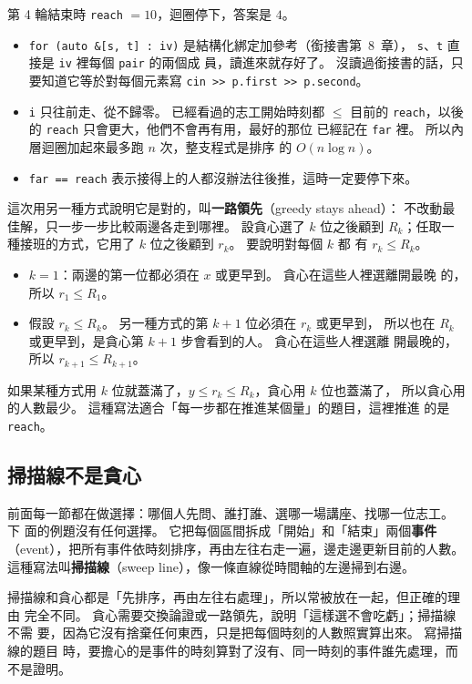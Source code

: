 第 4 輪結束時 \texttt{reach} $= 10$，迴圈停下，答案是 $4$。

\begin{itemize}
\item \texttt{for (auto \&[s, t] : iv)} 是結構化綁定加參考（銜接書第~8~章），
\texttt{s}、\texttt{t} 直接是 \texttt{iv} 裡每個 \texttt{pair} 的兩個成
員，讀進來就存好了。 沒讀過銜接書的話，只要知道它等於對每個元素寫
\texttt{cin >> p.first >> p.second}。
\item \texttt{i} 只往前走、從不歸零。 已經看過的志工開始時刻都 $\le$ 目前的
\texttt{reach}，以後的 \texttt{reach} 只會更大，他們不會再有用，最好的那位
已經記在 \texttt{far} 裡。 所以內層迴圈加起來最多跑 $n$ 次，整支程式是排序
的 $O(n \log n)$。
\item \texttt{far == reach} 表示接得上的人都沒辦法往後推，這時一定要停下來。
\end{itemize}

這次用另一種方式說明它是對的，叫\textbf{一路領先}（greedy stays ahead）：
不改動最佳解，只一步一步比較兩邊各走到哪裡。 設貪心選了 $k$ 位之後顧到
$R_k$；任取一種接班的方式，它用了 $k$ 位之後顧到 $r_k$。 要說明對每個 $k$ 都
有 $r_k \le R_k$。

\begin{itemize}
\item $k = 1$：兩邊的第一位都必須在 $x$ 或更早到。 貪心在這些人裡選離開最晚
的，所以 $r_1 \le R_1$。
\item 假設 $r_k \le R_k$。 另一種方式的第 $k + 1$ 位必須在 $r_k$ 或更早到，
所以也在 $R_k$ 或更早到，是貪心第 $k + 1$ 步會看到的人。 貪心在這些人裡選離
開最晚的，所以 $r_{k+1} \le R_{k+1}$。
\end{itemize}

如果某種方式用 $k$ 位就蓋滿了，$y \le r_k \le R_k$，貪心用 $k$ 位也蓋滿了，
所以貪心用的人數最少。 這種寫法適合「每一步都在推進某個量」的題目，這裡推進
的是 \texttt{reach}。

\subsection{掃描線不是貪心}

前面每一節都在做選擇：哪個人先問、誰打誰、選哪一場講座、找哪一位志工。 下
面的例題沒有任何選擇。 它把每個區間拆成「開始」和「結束」兩個\textbf{事件}
（event），把所有事件依時刻排序，再由左往右走一遍，邊走邊更新目前的人數。
這種寫法叫\textbf{掃描線}（sweep line），像一條直線從時間軸的左邊掃到右邊。

掃描線和貪心都是「先排序，再由左往右處理」，所以常被放在一起，但正確的理由
完全不同。 貪心需要交換論證或一路領先，說明「這樣選不會吃虧」；掃描線不需
要，因為它沒有捨棄任何東西，只是把每個時刻的人數照實算出來。 寫掃描線的題目
時，要擔心的是事件的時刻算對了沒有、同一時刻的事件誰先處理，而不是證明。

